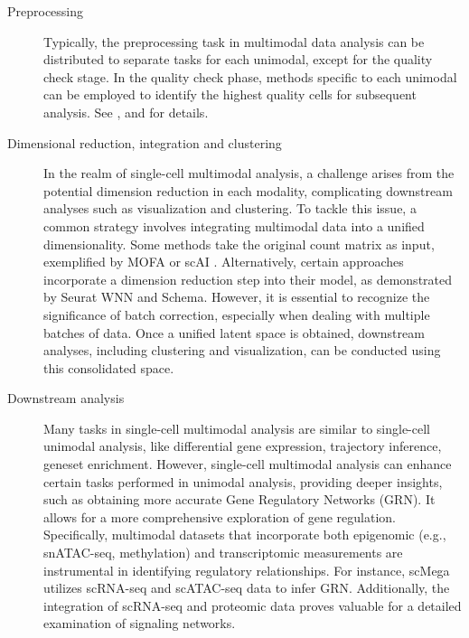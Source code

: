 \begin{description}
	\item[Preprocessing]
	Typically, the preprocessing task in multimodal data analysis can be distributed to separate tasks for each unimodal, except for the quality check stage. In the quality check phase, methods specific to each unimodal can be employed to identify the highest quality cells for subsequent analysis. See ,  and  for details.

	\item[Dimensional reduction, integration and clustering]
	In the realm of single-cell multimodal analysis, a challenge arises from the potential dimension reduction in each modality, complicating downstream analyses such as visualization and clustering. To tackle this issue, a common strategy involves integrating multimodal data into a unified dimensionality. Some methods take the original count matrix as input, exemplified by MOFA \citep{argelaguet2020mofa+} or scAI \citep{jin2020scai}. Alternatively, certain approaches incorporate a dimension reduction step into their model, as demonstrated by Seurat WNN and Schema\citep{hao2021seurat4,singh2021schema}. However, it is essential to recognize the significance of batch correction, especially when dealing with multiple batches of data. Once a unified latent space is obtained, downstream analyses, including clustering and visualization, can be conducted using this consolidated space.

	\item[Downstream analysis]
	Many tasks in single-cell multimodal analysis are similar to single-cell unimodal analysis, like differential gene expression, trajectory inference, geneset enrichment. However, single-cell multimodal analysis can enhance certain tasks performed in unimodal analysis, providing deeper insights, such as obtaining more accurate Gene Regulatory Networks (GRN). It allows for a more comprehensive exploration of gene regulation. Specifically, multimodal datasets that incorporate both epigenomic (e.g., snATAC-seq, methylation) and transcriptomic measurements are instrumental in identifying regulatory relationships. For instance, scMega \citep{li2023scmega} utilizes scRNA-seq and scATAC-seq data to infer GRN. Additionally, the integration of scRNA-seq and proteomic data proves valuable for a detailed examination of signaling networks. 
\end{description}



